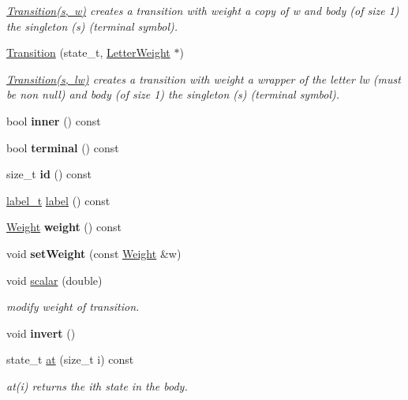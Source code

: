 \begin{DoxyCompactItemize}
\begin{DoxyCompactList}\small\item\em \mbox{\hyperlink{classTransition}{Transition(s, w)}} creates a transition with weight a copy of w and body (of size 1) the singleton (s) (terminal symbol). \end{DoxyCompactList}\item 
\mbox{\hyperlink{group__schemata_ga458b953211e3b5de292c8c1535ff7281}{Transition}} (state\+\_\+t, \mbox{\hyperlink{classLetterWeight}{Letter\+Weight}} $\ast$)
\begin{DoxyCompactList}\small\item\em \mbox{\hyperlink{classTransition}{Transition(s, lw)}} creates a transition with weight a wrapper of the letter lw (must be non null) and body (of size 1) the singleton (s) (terminal symbol). \end{DoxyCompactList}\item 
bool {\bfseries inner} () const
\item 
bool {\bfseries terminal} () const
\item 
\mbox{\label{classTransition_a77ab4e74f63933f38c6e2f8d875b6481}} 
size\+\_\+t {\bfseries id} () const
\item 
\mbox{\hyperlink{group__output_ga22fde970e635fcf63962743b2d5c441d}{label\+\_\+t}} \mbox{\hyperlink{group__schemata_ga97dce48d13fac75a4a444a68aae07608}{label}} () const
\item 
\mbox{\label{classTransition_a14627398184e9a306cd3e7770a90dd80}} 
\mbox{\hyperlink{classWeight}{Weight}} {\bfseries weight} () const
\item 
\mbox{\label{classTransition_a9430122ef00fdb0916a2c96d706345e4}} 
void {\bfseries set\+Weight} (const \mbox{\hyperlink{classWeight}{Weight}} \&w)
\item 
void \mbox{\hyperlink{group__schemata_ga6d7e864cf11645e39e3999516c2438f7}{scalar}} (double)
\begin{DoxyCompactList}\small\item\em modify weight of transition. \end{DoxyCompactList}\item 
void {\bfseries invert} ()
\item 
state\+\_\+t \mbox{\hyperlink{group__schemata_ga9e2e243bfa147bafd947f2cffd1da3ec}{at}} (size\+\_\+t i) const
\begin{DoxyCompactList}\small\item\em at(i) returns the ith state in the body. \end{DoxyCompactList}\item 

\end{DoxyCompactItemize}
